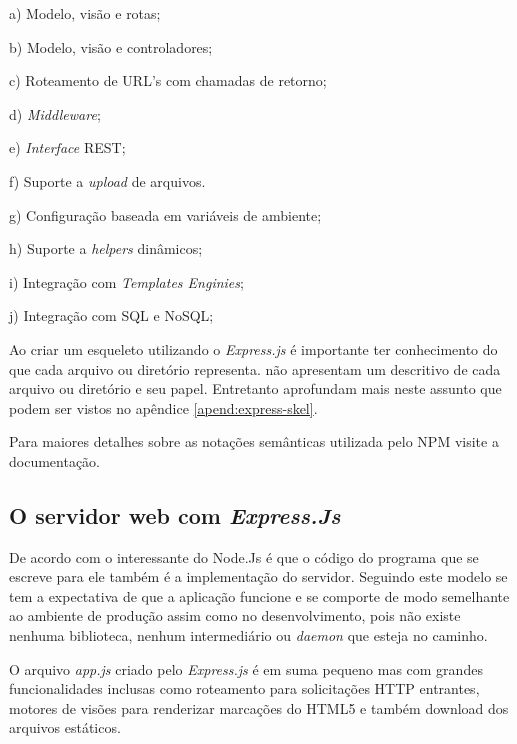   \begin{compactitem}
    \item[a)] Modelo, visão e rotas;   
    
    \item[b)] Modelo, visão e controladores;
    
    \item[c)] Roteamento de URL's com chamadas de retorno;
    
    \item[d)] \textit{Middleware};
    
    \item[e)] \textit{Interface} REST;
    
    \item[f)] Suporte a \textit{upload} de arquivos.
    
    \item[g)] Configuração baseada em variáveis de ambiente;
    
    \item[h)] Suporte a \textit{helpers} dinâmicos;
    
    \item[i)] Integração com \textit{Templates Enginies};
    
    \item[j)] Integração com SQL e NoSQL;
    
  \end{compactitem}
  
  Ao criar um esqueleto utilizando o \textit{Express.js} é importante ter conhecimento do que cada
  arquivo ou diretório representa.  não apresentam um descritivo de cada arquivo 
  ou diretório e seu papel. Entretanto  aprofundam mais neste assunto que podem ser vistos
  no apêndice \ref{apend:express-skel}.
  
  
  Para maiores detalhes sobre as notações semânticas utilizada pelo \ac{NPM} visite a documentação. \cite{Semver:2013}

\subsection{O servidor web com \textit{Express.Js}}
\label{servidor-web-express-js}

  
  De acordo com  o interessante do Node.Js é que o código do 
  programa que se escreve para ele também é a implementação do servidor. 
  Seguindo este modelo se tem a expectativa de que a aplicação funcione e se comporte de modo semelhante 
  ao ambiente de produção assim como no desenvolvimento, pois não existe nenhuma biblioteca, nenhum intermediário 
  ou \textit{daemon} que esteja no caminho.
  
  O arquivo \textit{app.js} criado pelo \textit{Express.js} é em suma pequeno mas com grandes funcionalidades inclusas como 
  roteamento para solicitações \ac{HTTP} entrantes, motores de visões para renderizar marcações do HTML5
  e também download dos arquivos estáticos.